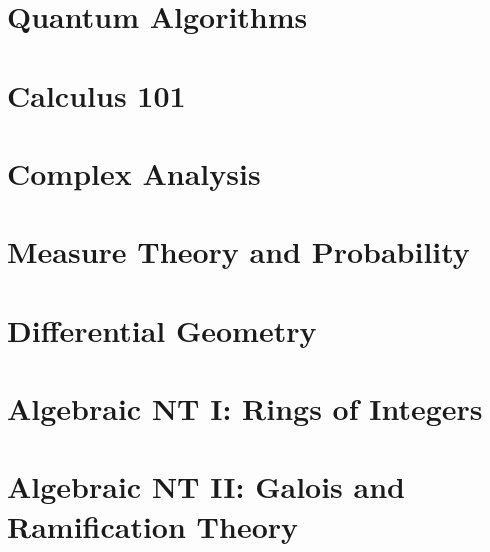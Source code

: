 \documentclass[11pt,twoside=semi,openright,numbers=noenddot]{scrreprt}
\begin{document}
\part{Quantum Algorithms}




\part{Calculus 101}





\part{Complex Analysis}




\part{Measure Theory and Probability}











\part{Differential Geometry}



\part{Algebraic NT I: Rings of Integers}






\part{Algebraic NT II: Galois and Ramification Theory}




\end{document}
